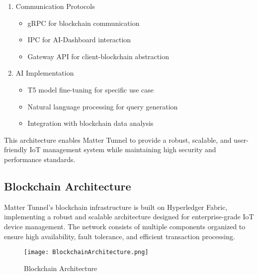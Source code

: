 \documentclass[conference]{IEEEtran}
\begin{document}
\begin{enumerate}[itemsep=2ex, parsep=1ex]
\begin{enumerate}
		\item Communication Protocols
		      \begin{itemize}[itemsep=0.5pt, parsep=0.5pt]
		      	\item gRPC for blockchain communication
		      	\item IPC for AI-Dashboard interaction
		      	\item Gateway API for client-blockchain abstraction
		      \end{itemize}
		      		      
		\item AI Implementation
		      \begin{itemize}[itemsep=0.5pt, parsep=0.5pt]
		      	\item T5 model fine-tuning for specific use case
		      	\item Natural language processing for query generation
		      	\item Integration with blockchain data analysis
		      \end{itemize}
	\end{enumerate}
\end{enumerate}

This architecture enables Matter Tunnel to provide a robust, scalable, and user-friendly IoT management system while maintaining high security and performance standards.
    
\subsection{Blockchain Architecture}

Matter Tunnel's blockchain infrastructure is built on Hyperledger Fabric, implementing a robust and scalable architecture designed for enterprise-grade IoT device management. The network consists of multiple components organized to ensure high availability, fault tolerance, and efficient transaction processing.

\begin{figure}[h!]
	\centering
	\texttt{[image: BlockchainArchitecture.png]}
	\caption{Blockchain Architecture}
	\label{fig:Blockchain Architecture}
\end{figure}
\end{document}
